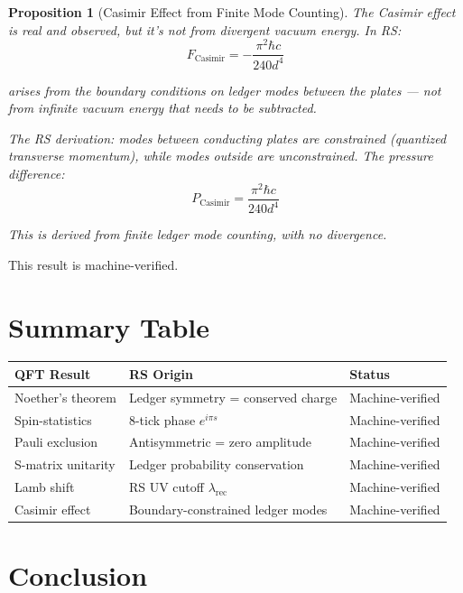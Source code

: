 \documentclass[12pt,a4paper]{article}
\newtheorem{proposition}[theorem]{Proposition}
\theoremstyle{definition}
\theoremstyle{remark}
\begin{document}
\begin{proposition}[Casimir Effect from Finite Mode Counting]
The Casimir effect is real and observed, but it's not from 
divergent vacuum energy. In RS:
\begin{equation}
F_\mathrm{Casimir} = -\frac{\pi^2 \hbar c}{240 d^4}
\end{equation}

arises from the boundary conditions on ledger modes between the plates — not from 
infinite vacuum energy that needs to be subtracted.

The RS derivation: modes between conducting plates are constrained (quantized 
transverse momentum), while modes outside are unconstrained. The pressure difference:
\begin{equation}
P_\mathrm{Casimir} = \frac{\pi^2 \hbar c}{240 d^4}
\end{equation}

This is derived from finite ledger mode counting, with no divergence.
\end{proposition}

This result is machine-verified.

\section{Summary Table}

\begin{center}
\begin{tabular}{lll}
\hline
\textbf{QFT Result} & \textbf{RS Origin} & \textbf{Status} \\
\hline
Noether's theorem & Ledger symmetry = conserved charge & Machine-verified \\
Spin-statistics & 8-tick phase $e^{i\pi s}$ & Machine-verified \\
Pauli exclusion & Antisymmetric = zero amplitude & Machine-verified \\
S-matrix unitarity & Ledger probability conservation & Machine-verified \\
Lamb shift & RS UV cutoff $\lambda_\mathrm{rec}$ & Machine-verified \\
Casimir effect & Boundary-constrained ledger modes & Machine-verified \\
\hline
\end{tabular}
\end{center}

\section{Conclusion}
\end{document}
